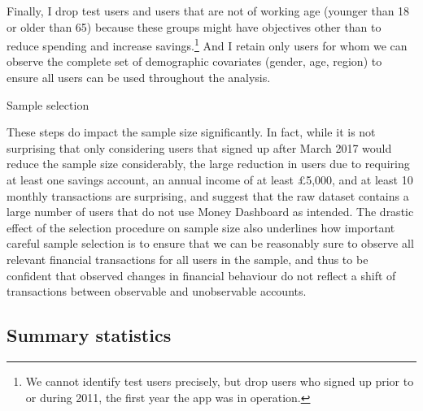 Finally, I drop test users and users that are not of working age (younger than
18 or older than 65) because these groups might have objectives other than to
reduce spending and increase savings.\footnote{We cannot identify test users
    precisely, but drop users who signed up prior to or during 2011, the first
year the app was in operation.} And I retain only users for whom we can observe
the complete set of demographic covariates (gender, age, region) to ensure all
users can be used throughout the analysis. 

\begin{table}
\centering\footnotesize
\caption{Sample selection}\label{tab:selection}

\end{table}

These steps do impact the sample size significantly. In fact, while it is not
surprising that only considering users that signed up after March 2017 would
reduce the sample size considerably, the large reduction in users due to
requiring at least one savings account, an annual income of at least
\pounds5,000, and at least 10 monthly transactions are surprising, and suggest
that the raw dataset contains a large number of users that do not use Money
Dashboard as intended. The drastic effect of the selection procedure on sample
size also underlines how important careful sample selection is to ensure that
we can be reasonably sure to observe all relevant financial
transactions for all users in the sample, and thus to be confident that
observed changes in financial behaviour do not reflect a shift of transactions
between observable and unobservable accounts.


\subsection{Summary statistics}%
\label{sub:summary_statistics}

